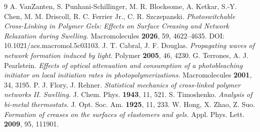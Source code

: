 \documentclass[11pt]{article}
\begin{document}
\begin{thebibliography}{9}
 A. VanZanten, S. Punhani-Schillinger, M. R. Blocksome, A. Ketkar,
  S.-Y. Chen, M. M. Driscoll, R. C. Ferrier Jr., C. R. Szczepanski.
  \emph{Photoswitchable Cross-Linking in Polymer Gels: Effects on Surface Creasing and
  Network Relaxation during Swelling.} Macromolecules \textbf{2026}, 59, 4622--4635.
  DOI: 10.1021/acs.macromol.5c03103.
 J. T. Cabral, J. F. Douglas.
  \emph{Propagating waves of network formation induced by light.} Polymer \textbf{2005}, 46, 4230.
 G. Terrones, A. J. Pearlstein.
  \emph{Effects of optical attenuation and consumption of a photobleaching initiator on
  local initiation rates in photopolymerizations.} Macromolecules \textbf{2001}, 34, 3195.
 P. J. Flory, J. Rehner.
  \emph{Statistical mechanics of cross-linked polymer networks II. Swelling.}
  J. Chem. Phys. \textbf{1943}, 11, 521.
 S. Timoshenko.
  \emph{Analysis of bi-metal thermostats.} J. Opt. Soc. Am. \textbf{1925}, 11, 233.
 W. Hong, X. Zhao, Z. Suo.
  \emph{Formation of creases on the surfaces of elastomers and gels.}
  Appl. Phys. Lett. \textbf{2009}, 95, 111901.
\end{thebibliography}
\end{document}
